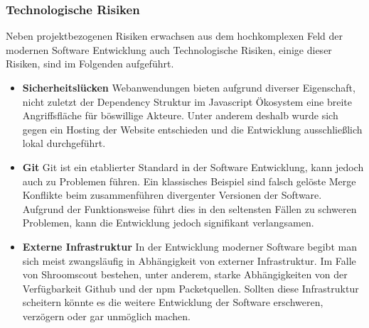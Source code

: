 \documentclass[../main.tex]{subfiles} %
\begin{document}
\subsubsection{Technologische Risiken} %

Neben projektbezogenen Risiken erwachsen aus dem hochkomplexen Feld der modernen Software Entwicklung auch Technologische Risiken,
einige dieser Risiken, sind im Folgenden aufgeführt.

\begin{itemize}

	\item \textbf{Sicherheitslücken}
		Webanwendungen bieten aufgrund diverser Eigenschaft, nicht zuletzt der Dependency Struktur im Javascript Ökosystem
		eine breite Angriffsfläche für böswillige Akteure. Unter anderem deshalb wurde sich gegen ein Hosting der Website entschieden
		und die Entwicklung ausschließlich lokal durchgeführt.
	\item \textbf{Git}
		Git ist ein etablierter Standard in der Software Entwicklung, kann jedoch auch zu Problemen führen.
		Ein klassisches Beispiel sind falsch gelöste Merge Konflikte beim zusammenführen divergenter Versionen der Software.
		Aufgrund der Funktionsweise führt dies in den seltensten Fällen zu schweren Problemen, kann die Entwicklung jedoch 
		signifikant verlangsamen.
	\item \textbf{Externe Infrastruktur}
		In der Entwicklung moderner Software begibt man sich meist zwangsläufig in Abhängigkeit von externer Infrastruktur.
		Im Falle von Shroomscout bestehen, unter anderem, starke Abhängigkeiten von der Verfügbarkeit Github und der npm Packetquellen.
		Sollten diese Infrastruktur scheitern könnte es die weitere Entwicklung der Software erschweren, verzögern oder gar unmöglich machen.

\end{itemize}
\end{document}
